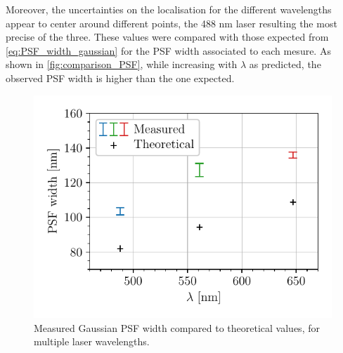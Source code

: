 %
Moreover, the uncertainties on the localisation for the different wavelengths appear to center around different points, the 488 nm laser resulting the most precise of the three.
These values were compared with those expected from \autoref{eq:PSF_width_gaussian} for the PSF width associated to each mesure.
As shown in \autoref{fig:comparison_PSF}, while increasing with $\lambda$ as predicted,
the observed PSF width is higher than the one expected.
\begin{figure}[htbp]
    \centering
    \includegraphics[scale=1]{figures/comparison_PSF.pdf}
    \caption{Measured Gaussian PSF width compared to theoretical values, for multiple laser wavelengths.}
    \label{fig:comparison_PSF}
\end{figure}


